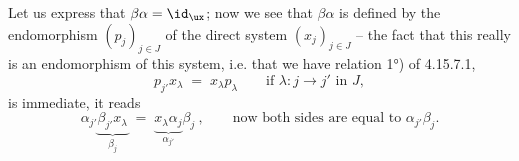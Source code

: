 Let us express that $\beta\alpha = \id_{\ux}$; now we see that $\beta\alpha$ is defined by the endomorphism $(p_j)_{j\in J}$ of the direct system $(x_j)_{j\in J}$ -- the fact that this really is an endomorphism of this system, i.e. that we have relation 1°) of 4.15.7.1,
\[
p_{j'}x_\lambda \;=\; x_\lambda p_\lambda \qquad \text{if } \lambda : j \longrightarrow j' \text{ in } J, %
\]
is immediate, it reads
\[
\alpha_{j'}\underbrace{\beta_{j'}x_\lambda}_{\beta_j} \;=\; \underbrace{x_\lambda\alpha_j}_{\alpha_{j'}}\beta_j\ , \qquad \text{now both sides are equal to } \alpha_{j'}\beta_j.
\]
